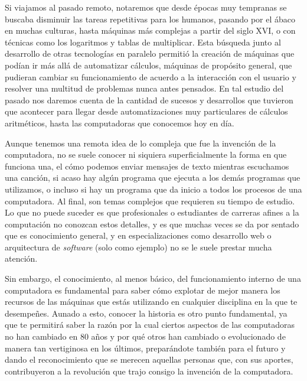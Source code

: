 \documentclass[letterpaper,12pt,oneside]{book}
\begin{document}
	Si viajamos al pasado remoto, notaremos que desde épocas muy tempranas se buscaba disminuir las tareas repetitivas para los humanos, pasando por el ábaco
	en muchas culturas, hasta máquinas más complejas a partir del siglo XVI, o con técnicas como los logaritmos y tablas de multiplicar. Esta búsqueda junto
	al desarrollo de otras tecnologías en paralelo permitió la creación de máquinas que podían ir más allá de automatizar cálculos,
	máquinas de propósito general, que pudieran cambiar su funcionamiento de acuerdo a la interacción con el usuario y resolver
	una multitud de problemas nunca antes pensados\cite{ifrah_universal_2001}. En tal estudio del pasado nos daremos cuenta de la cantidad de sucesos y desarrollos que tuvieron 
	que acontecer para llegar desde automatizaciones muy particulares de cálculos aritméticos, hasta las computadoras que conocemos hoy en día. 

	Aunque tenemos una remota idea de lo compleja que fue la invención de la computadora, no se suele conocer ni siquiera superficialmente
	la forma en que funciona una, el cómo podemos enviar mensajes de texto mientras escuchamos una canción, si acaso hay algún programa que ejecuta a los 
	demás programas que utilizamos, o incluso si hay un programa que da inicio a todos los procesos de una computadora. Al final, son temas complejos
	que requieren su tiempo de estudio. Lo que no puede suceder es que profesionales o estudiantes de carreras afines a la computación no conozcan estos detalles, y
	es que muchas veces se da por sentado que es conocimiento general, y en especializaciones como desarrollo web o arquitectura de \textit{software} (solo como ejemplo) no se le suele
	prestar mucha atención.
 
    Sin embargo, el conocimiento, al menos básico, del funcionamiento interno de una computadora es fundamental para saber
	cómo explotar de mejor manera los recursos de las máquinas que estás utilizando en cualquier disciplina en la que te desempeñes. Aunado a esto, conocer la historia
	es otro punto fundamental,
	ya que te permitirá saber la razón por la cual ciertos aspectos de las computadoras no han cambiado en 80 años y por qué otros han cambiado o evolucionado
	de manera tan vertiginosa en los últimos, preparándote también para el futuro y dando el reconocimiento que se merecen aquellas personas que,
	con sus aportes, contribuyeron a la revolución que trajo consigo la invención de la computadora.
	
\end{document}
